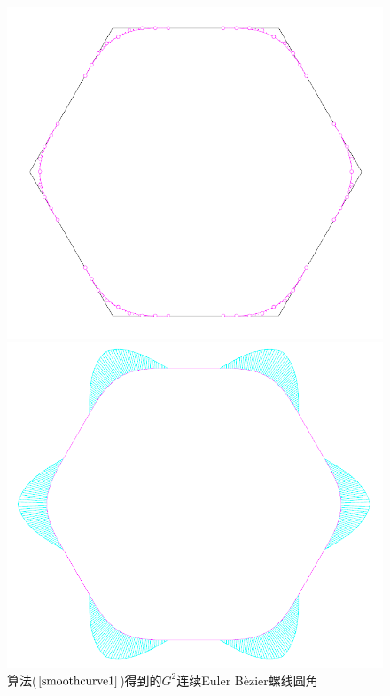 \documentclass[utf8]{ctexart} %
\begin{document}
		 \begin{figure}[htbp]\label{EB_figure}
		 	\centering
		 	\begin{minipage}{0.49\linewidth}
		 		\centering
		 		\includegraphics[width=0.9\linewidth]{figures/SmoothCorner1.png}
		 	\end{minipage}
		 	\begin{minipage}{0.49\linewidth}
		 		\centering
		 		\includegraphics[width=0.9\linewidth]{figures/SmoothCorner2.png}
		 	\end{minipage}
		 	\caption{算法($\ref{smoothcurve1}$)得到的$G^2$连续Euler B\`{e}zier螺线圆角}
		 \end{figure}
\end{document}
